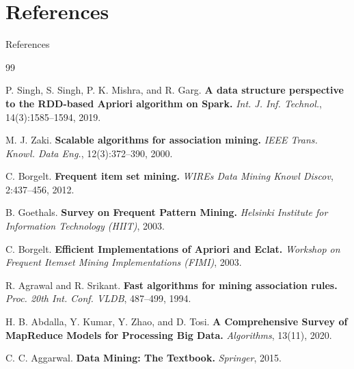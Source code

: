 
\section{References}
\begin{frame}[allowframebreaks]{References}
    \footnotesize
    \begin{thebibliography}{99}

        P. Singh, S. Singh, P. K. Mishra, and R. Garg.
        \newblock \textbf{A data structure perspective to the RDD-based Apriori algorithm on Spark.}
        \newblock \textit{Int. J. Inf. Technol.}, 14(3):1585--1594, 2019.

        M. J. Zaki.
        \newblock \textbf{Scalable algorithms for association mining.}
        \newblock \textit{IEEE Trans. Knowl. Data Eng.}, 12(3):372--390, 2000.

        C. Borgelt.
        \newblock \textbf{Frequent item set mining.}
        \newblock \textit{WIREs Data Mining Knowl Discov}, 2:437--456, 2012.

        B. Goethals.
        \newblock \textbf{Survey on Frequent Pattern Mining.}
        \newblock \textit{Helsinki Institute for Information Technology (HIIT)}, 2003.

        C. Borgelt.
        \newblock \textbf{Efficient Implementations of Apriori and Eclat.}
        \newblock \textit{Workshop on Frequent Itemset Mining Implementations (FIMI)}, 2003.

        R. Agrawal and R. Srikant.
        \newblock \textbf{Fast algorithms for mining association rules.}
        \newblock \textit{Proc. 20th Int. Conf. VLDB}, 487--499, 1994.

        H. B. Abdalla, Y. Kumar, Y. Zhao, and D. Tosi.
        \newblock \textbf{A Comprehensive Survey of MapReduce Models for Processing Big Data.}
        \newblock \textit{Algorithms}, 13(11), 2020.

        C. C. Aggarwal.
        \newblock \textbf{Data Mining: The Textbook.}
        \newblock \textit{Springer}, 2015.

    \end{thebibliography}
\end{frame}
